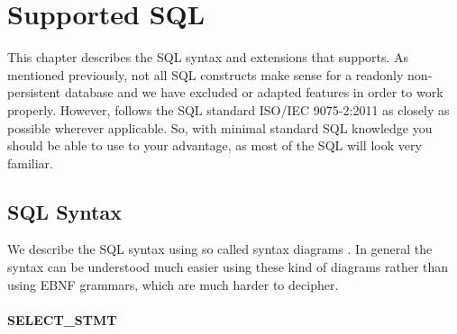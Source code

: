 
\chapter{Supported SQL}

This chapter describes the SQL syntax and extensions that \csvsqldb{} supports. As mentioned previously, not all SQL constructs make sense for a readonly non-persistent database and we have excluded or adapted features in order to work properly. However, \csvsqldb{} follows the SQL standard ISO/IEC 9075-2:2011 \cite{ISO_SQL_Standard} as closely as possible wherever applicable. So, with minimal standard SQL knowledge you should be able to use \csvsqldb{} to your advantage, as most of the SQL will look very familiar.

\section{SQL Syntax}
We describe the SQL syntax using so called syntax diagrams \cite{Wikipedia_Syntaxdiagram}. In general the syntax can be understood much easier using these kind of diagrams rather than using EBNF grammars, which are much harder to decipher.


\subsubsection{SELECT\_STMT}

